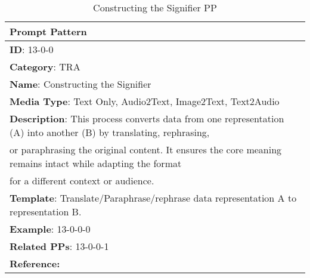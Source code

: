 \begin{table}[h!]
\fontsize{9pt}{10pt}\selectfont
\centering
\caption{Constructing the Signifier PP}
\label{tab:Constructing_the_Signifier_PP}
\begin{tabular}{|l|}
    \hline
    \textbf{Prompt Pattern} \\ \hline
    \textbf{ID}: 13-0-0\\ 
    \textbf{Category}: TRA\\ 
    \textbf{Name}: Constructing the Signifier \\ 
    \textbf{Media Type}: Text Only, Audio2Text, Image2Text, Text2Audio\\ 
    \textbf{Description}: This process converts data from one representation (A) into another (B) by translating, rephrasing, \\or paraphrasing the original content. It ensures the core meaning remains intact while adapting the format \\for a different context or audience. \\ 
    \textbf{Template}: Translate/Paraphrase/rephrase  data representation A to representation B.\\ 
    \textbf{Example}: 13-0-0-0\\ 
    \textbf{Related PPs}: 13-0-0-1\\ 
    \textbf{Reference:} \cite{Reynolds2021PromptParadigm}\\ \hline
\end{tabular}
\end{table}
            
